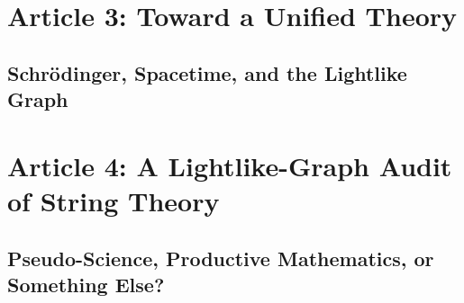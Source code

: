 \documentclass[11pt]{article}
\begin{document}
\section*{Article 3: Toward a Unified Theory}
\subsection*{Schr\"odinger, Spacetime, and the Lightlike Graph}

\begin{abstract}
Quantum mechanics and general relativity rest on incompatible pictures of time. The time-dependent and time-independent Schr\"odinger equations treat time as a distinguished external parameter, while general relativity binds time to geometry in the form of spacetime. The mismatch is usually papered over by treating quantum mechanics as a theory of states on a fixed spacetime background, but the cost of doing so is the open problem of wave-function collapse and the unresolved status of the ``observer''. We propose that, as in the companion papers, restricting attention to the lightlike graph softens the mismatch: the two Schr\"odinger equations both become statements about graph incidence --- one about the existence of an edge, the other about the topology of its endpoints --- and the observer becomes a vertex in the graph rather than a frame-bound external agent. We argue that this is the right vantage point from which to begin searching for a unification.
\end{abstract}

\section*{Article 4: A Lightlike-Graph Audit of String Theory}
\subsection*{Pseudo-Science, Productive Mathematics, or Something Else?}
\end{document}

